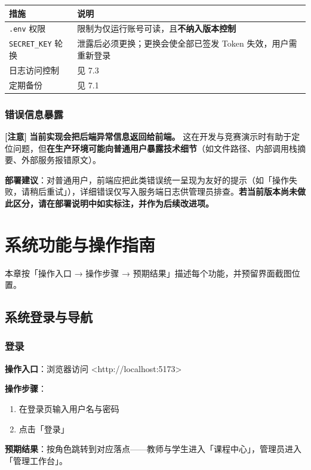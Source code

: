 \documentclass[UTF8,a4paper,11pt]{ctexrep}
\newcommand{\warnmark}{\textcolor{todobar}{\textbf{[注意]}}}
\begin{document}
\begin{center}
\small
\begin{tabularx}{\linewidth}{@{}XX@{}}
\toprule
措施 & 说明 \\
\midrule
\texttt{.env} 权限 & 限制为仅运行账号可读，且\textbf{不纳入版本控制} \\
\texttt{SECRET\_KEY} 轮换 & 泄露后必须更换；更换会使全部已签发 Token 失效，用户需重新登录 \\
日志访问控制 & 见 7.3 \\
定期备份 & 见 7.1 \\
\bottomrule
\end{tabularx}
\end{center}

\subsection{错误信息暴露}

\warnmark{} \textbf{当前实现会把后端异常信息返回给前端。} 这在开发与竞赛演示时有助于定位问题，但\textbf{在生产环境可能向普通用户暴露技术细节}（如文件路径、内部调用栈摘要、外部服务报错原文）。

\textbf{部署建议}：对普通用户，前端应把此类错误统一呈现为友好的提示（如「操作失败，请稍后重试」），详细错误仅写入服务端日志供管理员排查。\textbf{若当前版本尚未做此区分，请在部署说明中如实标注，并作为后续改进项。}


\chapter{系统功能与操作指南}

本章按「操作入口 → 操作步骤 → 预期结果」描述每个功能，并预留界面截图位置。


\section{系统登录与导航}


\subsection{登录}

\textbf{操作入口}：浏览器访问 <http://localhost:5173>

\textbf{操作步骤}：

\begin{enumerate}
\item 在登录页输入用户名与密码
\item 点击「登录」
\end{enumerate}
\textbf{预期结果}：按角色跳转到对应落点——教师与学生进入「课程中心」，管理员进入「管理工作台」。
\end{document}
